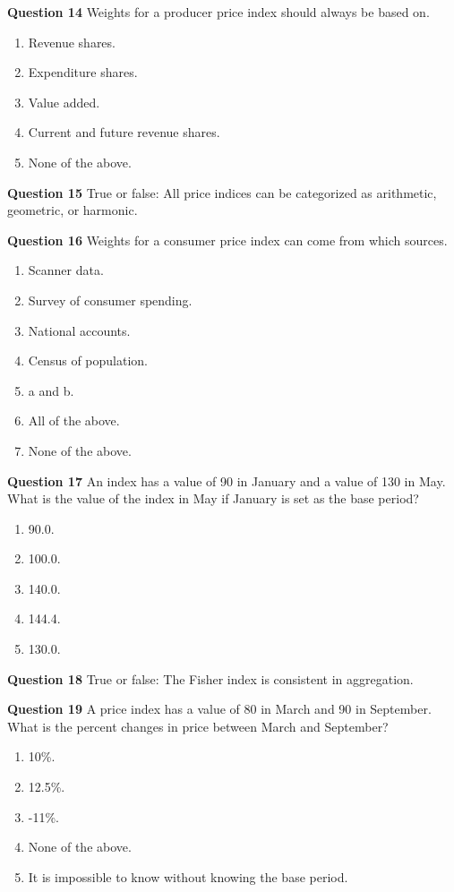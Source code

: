\documentclass[]{article}
\begin{document}
\textbf{Question 14} Weights for a producer price index should always be based on.

\begin{enumerate}
\def\labelenumi{\alph{enumi})}
\item
  Revenue shares.
\item
  Expenditure shares.
\item
  Value added.
\item
  Current and future revenue shares.
\item
  None of the above.
\end{enumerate}

\textbf{Question 15} True or false: All price indices can be categorized as arithmetic, geometric, or harmonic.

\textbf{Question 16} Weights for a consumer price index can come from which sources.

\begin{enumerate}
\def\labelenumi{\alph{enumi})}
\item
  Scanner data.
\item
  Survey of consumer spending.
\item
  National accounts.
\item
  Census of population.
\item
  a and b.
\item
  All of the above.
\item
  None of the above.
\end{enumerate}

\textbf{Question 17} An index has a value of 90 in January and a value of 130 in May. What is the value of the index in May if January is set as the base period?

\begin{enumerate}
\def\labelenumi{\alph{enumi})}
\item
  90.0.
\item
  100.0.
\item
  140.0.
\item
  144.4.
\item
  130.0.
\end{enumerate}

\textbf{Question 18} True or false: The Fisher index is consistent in aggregation.

\textbf{Question 19} A price index has a value of 80 in March and 90 in September. What is the percent changes in price between March and September?

\begin{enumerate}
\def\labelenumi{\alph{enumi})}
\item
  10\%.
\item
  12.5\%.
\item
  -11\%.
\item
  None of the above.
\item
  It is impossible to know without knowing the base period.
\end{enumerate}
\end{document}
